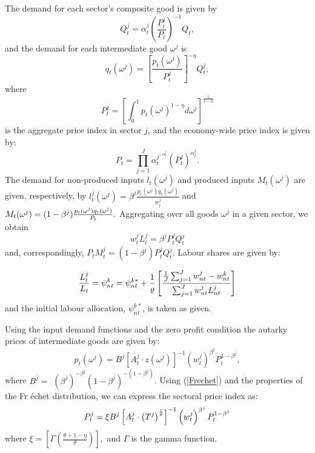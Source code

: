 \documentclass{article}
\begin{document}
The demand for each sector's composite good is given by 
\begin{equation}
Q_{t}^{j}=\alpha _{t}^{j}\left( \frac{P_{t}^{j}}{P_{t}}\right) ^{-1}Q_{t},
\label{QJ}
\end{equation}%
and the demand for each intermediate good $\omega ^{j}$ is 
\begin{equation*}
q_{t}(\omega ^{j})=\left[ \frac{p_{t}(\omega ^{j})}{P_{t}^{j}}\right]
^{-\eta }Q_{t}^{j}, 
\end{equation*}%
where 
\begin{equation}
P_{t}^{j}=\left[ \int_{0}^{1}p_{t}(\omega ^{j})^{1-\eta }d\omega ^{j}\right]
^{\frac{1}{1-\eta }}  \label{PJ}
\end{equation}%
is the aggregate price index in sector $j$, and the economy-wide price index
is given by: 
\begin{equation}
P_{t}=\prod_{j=1}^{J}\alpha _{t}^{j^{-\alpha _{t}^{j}}}\left(
P_{t}^{j}\right) ^{\alpha _{t}^{j}}.  \label{Pt}
\end{equation}%
The demand for non-produced inputs $l_{t}(\omega ^{j})$ and produced inputs $%
M_{t}(\omega ^{j})$ are given, respectively, by $l_{t}^{j}(\omega
^{j})=\beta ^{j}\frac{p_{t}(\omega ^{j})q_{t}(\omega ^{j})}{w_{t}^{j}}$ and $%
M_{t}(\omega ^{j})=(1-\beta ^{j})\frac{p_{t}(\omega ^{j})q_{t}(\omega ^{j})}{%
P_{t}}.$ Aggregating over all goods $\omega ^{j}$ in a given sector, we
obtain 
\begin{equation}
w_{t}^{j}L_{t}^{j}=\beta ^{j}P_{t}^{j}Q_{t}^{j}  \label{Labor share}
\end{equation}%
and, correspondingly, $P_{t}M_{t}^{j}=(1-\beta ^{j})P_{t}^{j}Q_{t}^{j}.$
Labour shares are given by:

\begin{equation*}
\frac{L_{t}^{j}}{L_{t}}=\psi _{nt}^{k}=\psi _{nt}^{k\ast }+\frac{1}{\varrho }%
\left[ \frac{\frac{1}{J}\sum_{j=1}^{J}w_{nt}^{j}-w_{nt}^{k}}{%
\sum_{j=1}^{J}w_{nt}^{j}L_{nt}^{j}}\right] 
\end{equation*}%
and the initial labour allocation, $\psi _{nt}^{k\ast }$, is taken as given.

Using the input demand functions and the zero profit condition the autarky
prices of intermediate goods are given by: 
\begin{equation}
p_{t}(\omega ^{j})=B^{j}\left[ A_{t}^{j}\cdot z(\omega ^{j})\right]
^{-1}\left( w_{t}^{j}\right) ^{\beta ^{j}}P_{t}^{1-\beta ^{j}},
\label{Frechet}
\end{equation}%
where $B^{j}=$ $\left( \beta ^{j}\right) ^{-\beta ^{j}}(1-\beta
^{j})^{-(1-\beta ^{j})}$. Using (\ref{Frechet}) and the properties of the Fr%
\'{e}chet distribution, we can express the sectoral price index as: 
\begin{equation}
P_{t}^{j}=\xi B^{j}\left[ A_{t}^{j}\cdot \left( T^{j}\right) ^{\frac{1}{%
\theta }}\right] ^{-1}\left( w_{t}^{j}\right) ^{\beta ^{j}}P_{t}^{1-\beta
^{j}}
\end{equation}%
where $\xi =\left[ \Gamma \left( \frac{\theta +1-\eta }{\theta }\right) %
\right] ,$ and $\Gamma $ is the gamma function.
\end{document}
